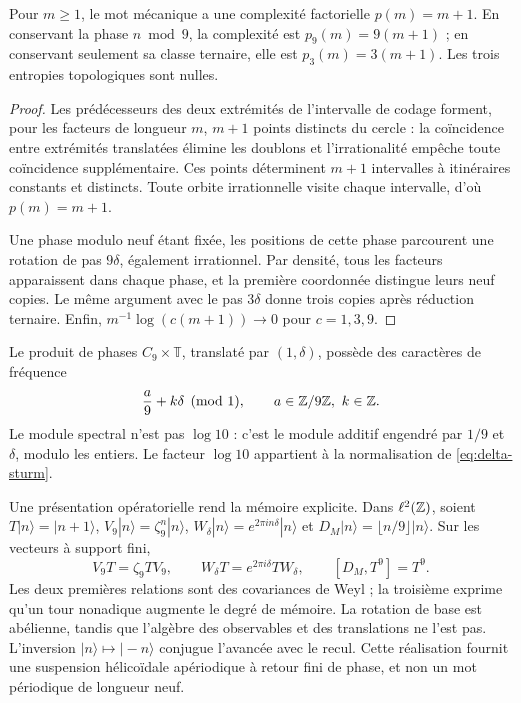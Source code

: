 \begin{theorem}
Pour \(m\ge1\), le mot mécanique a une complexité factorielle \(p(m)=m+1\). En conservant la phase \(n\bmod9\), la complexité est \(p_9(m)=9(m+1)\) ; en conservant seulement sa classe ternaire, elle est \(p_3(m)=3(m+1)\). Les trois entropies topologiques sont nulles.
\end{theorem}
\begin{proof}
Les prédécesseurs des deux extrémités de l'intervalle de codage forment, pour les facteurs de longueur \(m\), \(m+1\) points distincts du cercle : la coïncidence entre extrémités translatées élimine les doublons et l'irrationalité empêche toute coïncidence supplémentaire. Ces points déterminent \(m+1\) intervalles à itinéraires constants et distincts. Toute orbite irrationnelle visite chaque intervalle, d'où \(p(m)=m+1\).

Une phase modulo neuf étant fixée, les positions de cette phase parcourent une rotation de pas \(9\delta\), également irrationnel. Par densité, tous les facteurs apparaissent dans chaque phase, et la première coordonnée distingue leurs neuf copies. Le même argument avec le pas \(3\delta\) donne trois copies après réduction ternaire. Enfin, \(m^{-1}\log(c(m+1))\to0\) pour \(c=1,3,9\).
\end{proof}

Le produit de phases \(C_9\times\mathbb T\), translaté par \((1,\delta)\), possède des caractères de fréquence
\[
 \frac a9+k\delta\pmod1,\qquad a\in\mathbb Z/9\mathbb Z,\ k\in\mathbb Z.
\]
Le module spectral n'est pas \(\log10\) : c'est le module additif engendré par \(1/9\) et \(\delta\), modulo les entiers. Le facteur \(\log10\) appartient à la normalisation de \eqref{eq:delta-sturm}.

Une présentation opératorielle rend la mémoire explicite. Dans \(\ell^2(\mathbb Z)\), soient \(T|n\rangle=|n+1\rangle\), \(V_9|n\rangle=\zeta_9^n|n\rangle\), \(W_\delta|n\rangle=e^{2\pi i n\delta}|n\rangle\) et \(D_M|n\rangle=\lfloor n/9\rfloor|n\rangle\). Sur les vecteurs à support fini,
\begin{equation}
 V_9T=\zeta_9TV_9,\qquad
 W_\delta T=e^{2\pi i\delta}TW_\delta,\qquad
 [D_M,T^9]=T^9.
 \label{eq:weyl-relojes}
\end{equation}
Les deux premières relations sont des covariances de Weyl ; la troisième exprime qu'un tour nonadique augmente le degré de mémoire. La rotation de base est abélienne, tandis que l'algèbre des observables et des translations ne l'est pas. L'inversion \(|n\rangle\mapsto|-n\rangle\) conjugue l'avancée avec le recul. Cette réalisation fournit une suspension hélicoïdale apériodique à retour fini de phase, et non un mot périodique de longueur neuf.

